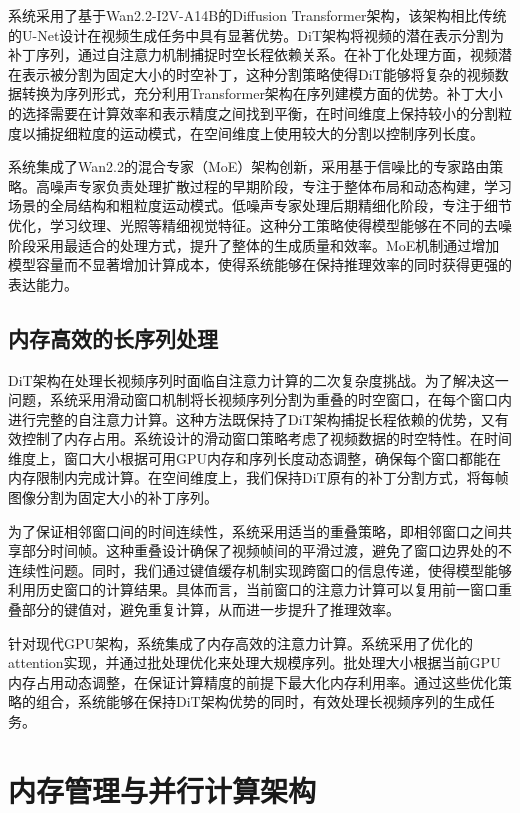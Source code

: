 系统采用了基于Wan2.2-I2V-A14B的Diffusion Transformer架构，该架构相比传统的U-Net设计在视频生成任务中具有显著优势。DiT架构将视频的潜在表示分割为补丁序列，通过自注意力机制捕捉时空长程依赖关系。在补丁化处理方面，视频潜在表示被分割为固定大小的时空补丁，这种分割策略使得DiT能够将复杂的视频数据转换为序列形式，充分利用Transformer架构在序列建模方面的优势。补丁大小的选择需要在计算效率和表示精度之间找到平衡，在时间维度上保持较小的分割粒度以捕捉细粒度的运动模式，在空间维度上使用较大的分割以控制序列长度。

系统集成了Wan2.2的混合专家（MoE）架构创新，采用基于信噪比的专家路由策略。高噪声专家负责处理扩散过程的早期阶段，专注于整体布局和动态构建，学习场景的全局结构和粗粒度运动模式。低噪声专家处理后期精细化阶段，专注于细节优化，学习纹理、光照等精细视觉特征。这种分工策略使得模型能够在不同的去噪阶段采用最适合的处理方式，提升了整体的生成质量和效率。MoE机制通过增加模型容量而不显著增加计算成本，使得系统能够在保持推理效率的同时获得更强的表达能力。

\subsection{内存高效的长序列处理}

DiT架构在处理长视频序列时面临自注意力计算的二次复杂度挑战。为了解决这一问题，系统采用滑动窗口机制将长视频序列分割为重叠的时空窗口，在每个窗口内进行完整的自注意力计算。这种方法既保持了DiT架构捕捉长程依赖的优势，又有效控制了内存占用。系统设计的滑动窗口策略考虑了视频数据的时空特性。在时间维度上，窗口大小根据可用GPU内存和序列长度动态调整，确保每个窗口都能在内存限制内完成计算。在空间维度上，我们保持DiT原有的补丁分割方式，将每帧图像分割为固定大小的补丁序列。

为了保证相邻窗口间的时间连续性，系统采用适当的重叠策略，即相邻窗口之间共享部分时间帧。这种重叠设计确保了视频帧间的平滑过渡，避免了窗口边界处的不连续性问题。同时，我们通过键值缓存机制实现跨窗口的信息传递，使得模型能够利用历史窗口的计算结果。具体而言，当前窗口的注意力计算可以复用前一窗口重叠部分的键值对，避免重复计算，从而进一步提升了推理效率。

针对现代GPU架构，系统集成了内存高效的注意力计算。系统采用了优化的attention实现，并通过批处理优化来处理大规模序列。批处理大小根据当前GPU内存占用动态调整，在保证计算精度的前提下最大化内存利用率。通过这些优化策略的组合，系统能够在保持DiT架构优势的同时，有效处理长视频序列的生成任务。

\section{内存管理与并行计算架构}

